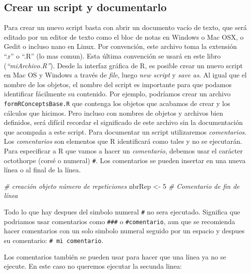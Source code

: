 \documentclass[]{book}
\makeatletter
\newenvironment{Shaded}{\begin{snugshade}}{\end{snugshade}}
\newcommand{\DecValTok}[1]{\textcolor[rgb]{0.00,0.00,0.81}{#1}}
\newcommand{\StringTok}[1]{\textcolor[rgb]{0.31,0.60,0.02}{#1}}
\newcommand{\CommentTok}[1]{\textcolor[rgb]{0.56,0.35,0.01}{\textit{#1}}}
\newcommand{\NormalTok}[1]{#1}
\newenvironment{kframe}{%
\medskip{}
\setlength{\fboxsep}{.8em}
 \def\at@end@of@kframe{}%
 \ifinner\ifhmode%
  \def\at@end@of@kframe{\end{minipage}}%
  \begin{minipage}{\columnwidth}%
 \fi\fi%
 \def\FrameCommand##1{\hskip\@totalleftmargin \hskip-\fboxsep
 \colorbox{shadecolor}{##1}\hskip-\fboxsep
     \hskip-\linewidth \hskip-\@totalleftmargin \hskip\columnwidth}%
 \MakeFramed {\advance\hsize-\width
   \@totalleftmargin\z@ \linewidth\hsize
   \@setminipage}}%
 {\par\unskip\endMakeFramed%
 \at@end@of@kframe}
\newenvironment{rmdblock}[1]
  {
  \begin{itemize}
  \renewcommand{\labelitemi}{
    \raisebox{-.7\height}[0pt][0pt]{
      {\setkeys{Gin}{width=3em,keepaspectratio}\texttt{[image: myIcons/\#1]}} %
    }
  }
  \setlength{\fboxsep}{1em}
  \begin{kframe}
  \item
  }
  {
  \end{kframe}
  \end{itemize}
  }
\newenvironment{rmdstyle}     %
  {\begin{rmdblock}{style}}   %
  {\end{rmdblock}}            %
\makeatother
\begin{document}
\subsection{Crear un script y
documentarlo}\label{crear-un-script-y-documentarlo}

Para crear un nuevo script basta con abrir un documento vacío de texto,
que será editado por un editor de texto como el bloc de notas en Windows
o Mac OSX, o Gedit o incluso nano en Linux. Por convención, este archivo
toma la extensión ``.r'' o ``.R'' (lo mas comun). Esta última convención
se usará en este libro (\emph{``miArchivo.R''}). Desde la interfaz
gráfica de R, es posible crear un nuevo script en Mac OS y Windows a
través de \emph{file}, luego \emph{new script} y \emph{save as}. Al
igual que el nombre de los objetos, el nombre del script es importante
para que podamos identificar fácilmente su contenido. Por ejemplo,
podríamos crear un archivo \texttt{formRConceptsBase.R} que contenga los
objetos que acabamos de crear y los cálculos que hicimos. Pero incluso
con nombres de objetos y archivos bien definidos, será difícil recordar
el significado de este archivo sin la documentación que acompaña a este
script. Para documentar un script utilizaremos \emph{comentarios}. Los
\emph{comentarios} son elementos que R identificará como tales y no se
ejecutarán. Para especificar a R que vamos a hacer un \emph{comentario},
debemos usar el carácter octothorpe (corsé o numeral) \texttt{\#}. Los
comentarios se pueden insertar en una nueva línea o al final de la
línea.

\begin{Shaded}
\begin{Highlighting}[]
\CommentTok{# creación objeto número de repeticiones}
\NormalTok{nbrRep <-}\StringTok{ }\DecValTok{5} \CommentTok{# Comentario de fin de línea}
\end{Highlighting}
\end{Shaded}

\begin{rmdstyle}
Todo lo que hay despues del simbolo numeral \texttt{\#} no sera
ejecutado. Significa que podriamos usar comentarios como \texttt{\#\#\#}
o \texttt{\#comentario}, aun que se recomienda hacer comentarios con un
solo simbolo numeral seguido por un espacio y despues su comentario:
\texttt{\#\ mi\ comentario}.
\end{rmdstyle}

Los comentarios también se pueden usar para hacer que una línea ya no se
ejecute. En este caso no queremos ejecutar la secunda linea:
\end{document}
